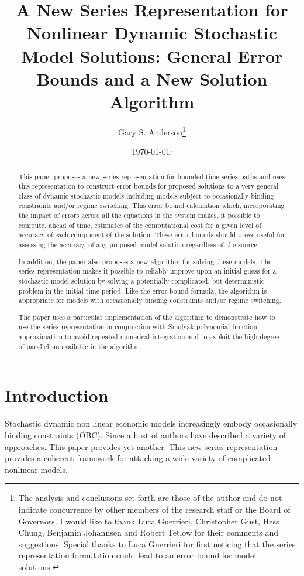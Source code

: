 \documentclass[12pt]{article}
\author{Gary S. Anderson\thanks{The analysis and conclusions set forth are those of the author and do not indicate concurrence by other members of the research staff or the Board of Governors. I would like to thank Luca Guerrieri, Christopher Gust, Hess Chung, Benjamin Johannsen  and Robert Tetlow for their comments and suggestions.  Special thanks to Luca Guerrieri for first noticing that the series representation formulation could lead to an error bound for model solutions.}}
\title{A New Series Representation for 
Nonlinear Dynamic Stochastic Model Solutions: General Error Bounds and a New Solution Algorithm}
\date{\today: \currenttime}
\begin{document}
\maketitle

\begin{abstract}
This paper proposes a new series representation for bounded time series paths and uses this representation to construct error bounds for proposed solutions to a very general class of dynamic stochastic models including models subject to occasionally binding constraints and/or regime switching.
This error bound calculation which, incorporating the impact of errors across  all the equations in 
the system makes, it possible to compute, ahead of time, estimates of the computational cost for a
given level of accuracy of each component of the solution.
These error bounds should prove useful for assessing the accuracy of any
proposed model solution regardless of the source.


In addition, the paper also proposes a new algorithm for solving these models.
The series representation makes it possible to reliably improve upon an initial
guess for a stochastic model solution by solving a 
potentially complicated, but deterministic problem in the initial time period.
Like the error bound formula, the algorithm is appropriate for models with occasionally binding constraints and/or regime switching. 


The  paper uses a particular implementation of the algorithm to
demonstrate how to use the 
series representation in conjunction with 
Smolyak polynomial function approximation to avoid repeated numerical integration
and to exploit the high degree of parallelism available in the algorithm.







\end{abstract}

\newpage
\tableofcontents
\newpage

\section{Introduction}





Stochastic dynamic non linear economic
models increasingly embody  occasionally binding constraints (OBC).
Since \cite{Christiano2000} a host of
authors have described a variety of approaches. 
\cite{holden15:_exist_dsge,guerrieri15:_occbin,benigno09,hintermaier10,brumm10,nakov08,haefke98,nakata12,gordon11,billi11,Hintermaier2010,Guerrieri2015}
This paper provides yet another.  This new series representation provides  a coherent framework for attacking a wide variety of complicated nonlinear models.
\end{document}
